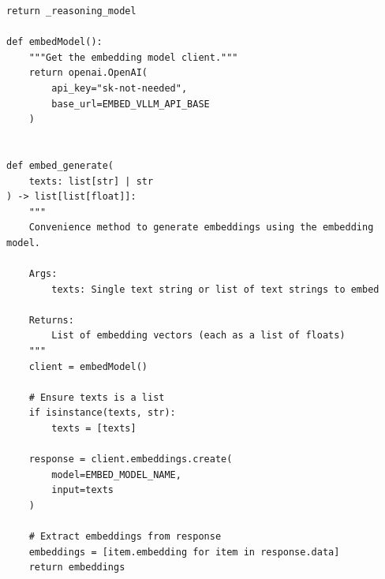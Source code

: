 \begin{lstlisting}[style=python, caption={Model client factory (\code{llm\_factory.py})}, label={lst:llm-factory}]
    return _reasoning_model

def embedModel():
    """Get the embedding model client."""
    return openai.OpenAI(
        api_key="sk-not-needed",
        base_url=EMBED_VLLM_API_BASE
    )


def embed_generate(
    texts: list[str] | str
) -> list[list[float]]:
    """
    Convenience method to generate embeddings using the embedding model.

    Args:
        texts: Single text string or list of text strings to embed

    Returns:
        List of embedding vectors (each as a list of floats)
    """
    client = embedModel()

    # Ensure texts is a list
    if isinstance(texts, str):
        texts = [texts]

    response = client.embeddings.create(
        model=EMBED_MODEL_NAME,
        input=texts
    )

    # Extract embeddings from response
    embeddings = [item.embedding for item in response.data]
    return embeddings
\end{lstlisting}
